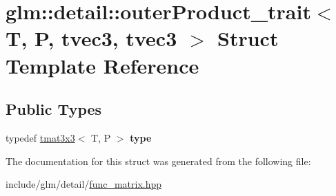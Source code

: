 \hypertarget{structglm_1_1detail_1_1outerProduct__trait_3_01T_00_01P_00_01tvec3_00_01tvec3_01_4}{}\section{glm\+:\+:detail\+:\+:outer\+Product\+\_\+trait$<$ T, P, tvec3, tvec3 $>$ Struct Template Reference}
\label{structglm_1_1detail_1_1outerProduct__trait_3_01T_00_01P_00_01tvec3_00_01tvec3_01_4}
\subsection*{Public Types}
\begin{DoxyCompactItemize}
\item 
\mbox{\label{structglm_1_1detail_1_1outerProduct__trait_3_01T_00_01P_00_01tvec3_00_01tvec3_01_4_ac6a4ba81935840a9b4e4603f0bc0e222}} 
typedef \hyperlink{structglm_1_1tmat3x3}{tmat3x3}$<$ T, P $>$ {\bfseries type}
\end{DoxyCompactItemize}


The documentation for this struct was generated from the following file\+:\begin{DoxyCompactItemize}
\item 
include/glm/detail/\hyperlink{func__matrix_8hpp}{func\+\_\+matrix.\+hpp}\end{DoxyCompactItemize}
